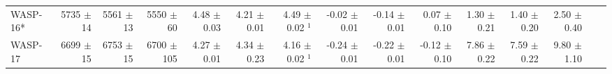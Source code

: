 \begin{sidewaystable*}[t!]
{\begin{tabular}{l r r r r r r r r r r r r r r}
WASP-16*  
& 5735  $\pm$ 14 
& 5561  $\pm$ 13 
&  5550 $\pm$ 60 
&   4.48  $\pm$ 0.03  
&  4.21  $\pm$ 0.01 
&  4.49  $\pm$ 0.02 $^1$
&  -0.02  $\pm$ 0.01 
& -0.14  $\pm$ 0.01 
&  0.07   $\pm$ 0.10 
& 1.30  $\pm$ 0.21 
& 1.40  $\pm$ 0.20 
& 2.50   $\pm$ 0.40  \\

 
 WASP-17  
 & 6699  $\pm$ 15 
& 6753  $\pm$ 15 
&  6700 $\pm$ 105 
&   4.27  $\pm$ 0.01 
 &  4.34  $\pm$ 0.23 
 &  4.16  $\pm$ 0.02 $^1$
 &  -0.24  $\pm$ 0.01 
 & -0.22  $\pm$ 0.01 
 &  -0.12   $\pm$ 0.10
 &  7.86  $\pm$ 0.22 
 & 7.59  $\pm$ 0.22 
 &  9.80  $\pm$ 1.10 \\


\end{tabular}}
\end{sidewaystable*}
